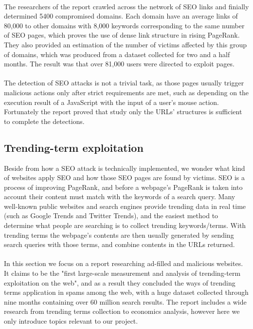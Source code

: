 \paragraph{} 
The
researchers of the report crawled across the network of SEO links and finially
determined 5400 compromised domains. Each domain have an average links of
80,000 to other domains with 8,000 keywords corresponding to the same number of
SEO pages, which proves the use of dense link structure in rising PageRank.
They also provided an estimation of the number of victims affected by this
group of domains, which was produced from a dataset collected for two and a
half months. The result was that over 81,000 users were directed to exploit
pages.
\paragraph{} 
The detection of SEO attacks is not a trivial task, as
those pages usually trigger malicious actions only after strict requirements
are met, such as depending on the execution result of a JavaScript with the
input of a user's mouse action. Fortunately the report proved that study only
the URLs' structures is sufficient to complete the detections. 


\subsection{Trending-term exploitation}
Beside from how a SEO attack is technically implemented, we wonder what kind 
of websites apply SEO and how those SEO pages are found by victims. SEO is a 
process of improving PageRank, and before a webpage's PageRank is taken into 
account their content must match with the keywords of a search query. Many
well-known public websites and search engines provide trending data in real
time (such as Google Trends and Twitter Trends), and the easiest method to
determine what people are searching is to collect trending keywords/terms. With
trending terms the webpage's contents are then usually generated by sending
search queries with those terms, and combine contents in the URLs returned.
\paragraph{}
In this section we focus on a report researching ad-filled and malicious
websites.\cite{fashioncrime} It claims to be the "first large-scale measurement
and analysis of trending-term exploitation on the web", and as a result they
concluded the ways of trending terms application in spams among the web, with a
huge dataset collected through nine months containing over 60 million search
results. The report includes a wide research from trending terms collection to 
economics analysis, however here we only introduce topics relevant to our 
project. 

